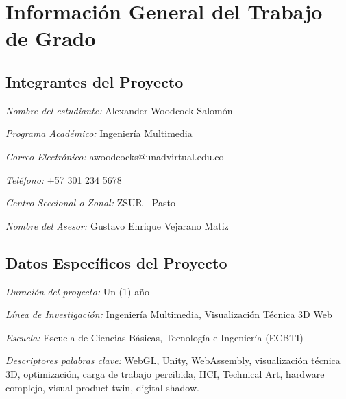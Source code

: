 \documentclass[12pt,letterpaper]{article}
\begin{document}
\section*{Información General del Trabajo de Grado}

\subsection*{Integrantes del Proyecto}

\textit{Nombre del estudiante:} Alexander Woodcock Salomón

\textit{Programa Académico:} Ingeniería Multimedia

\textit{Correo Electrónico:} awoodcocks@unadvirtual.edu.co

\textit{Teléfono:} +57 301 234 5678

\textit{Centro Seccional o Zonal:} ZSUR - Pasto

\textit{Nombre del Asesor:} Gustavo Enrique Vejarano Matiz

\subsection*{Datos Específicos del Proyecto}

\textit{Duración del proyecto:} Un (1) año

\textit{Línea de Investigación:} Ingeniería Multimedia, Visualización Técnica 3D Web

\textit{Escuela:} Escuela de Ciencias Básicas, Tecnología e Ingeniería (ECBTI)

\textit{Descriptores palabras clave:} WebGL, Unity, WebAssembly, visualización técnica 3D, optimización, carga de trabajo percibida, HCI, Technical Art, hardware complejo, visual product twin, digital shadow.









\end{document}
